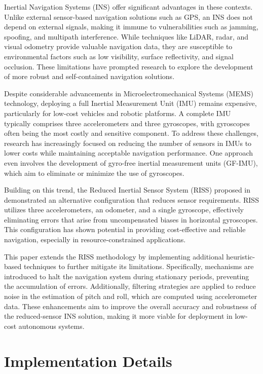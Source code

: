\documentclass[conference]{IEEEtran}
\begin{document}
Inertial Navigation Systems (INS) offer significant advantages in these contexts. Unlike external sensor-based navigation solutions such as GPS, an INS does not depend on external signals, making it immune to vulnerabilities such as jamming, spoofing, and multipath interference. While techniques like LiDAR, radar, and visual odometry provide valuable navigation data, they are susceptible to environmental factors such as low visibility, surface reflectivity, and signal occlusion. These limitations have prompted research to explore the development of more robust and self-contained navigation solutions.

Despite considerable advancements in Microelectromechanical Systems (MEMS) technology, deploying a full Inertial Measurement Unit (IMU) remains expensive, particularly for low-cost vehicles and robotic platforms. A complete IMU typically comprises three accelerometers and three gyroscopes, with gyroscopes often being the most costly and sensitive component. To address these challenges, research has increasingly focused on reducing the number of sensors in IMUs to lower costs while maintaining acceptable navigation performance. One approach even involves the development of gyro-free inertial measurement units (GF-IMU), which aim to eliminate or minimize the use of gyroscopes.

Building on this trend, the Reduced Inertial Sensor System (RISS) proposed in  \cite{noureldin2013} demonstrated an alternative configuration that reduces sensor requirements. RISS utilizes three accelerometers, an odometer, and a single gyroscope, effectively eliminating errors that arise from uncompensated biases in horizontal gyroscopes. This configuration has shown potential in providing cost-effective and reliable navigation, especially in resource-constrained applications.

This paper extends the RISS methodology by implementing additional heuristic-based techniques to further mitigate its limitations. Specifically, mechanisms are introduced to halt the navigation system during stationary periods, preventing the accumulation of errors. Additionally, filtering strategies are applied to reduce noise in the estimation of pitch and roll, which are computed using accelerometer data. These enhancements aim to improve the overall accuracy and robustness of the reduced-sensor INS solution, making it more viable for deployment in low-cost autonomous systems.

\section{Implementation Details}
\end{document}
